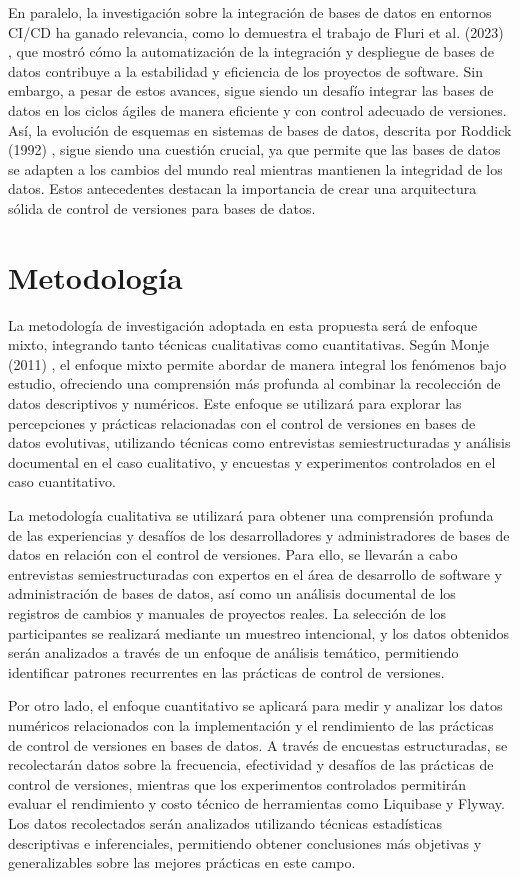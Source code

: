 \documentclass{IEEEtran}
\begin{document}
En paralelo, la investigación sobre la integración de bases de datos en entornos CI/CD ha ganado relevancia, como lo demuestra el trabajo de Fluri et al. (2023) \cite{fluri2023measuring}, que mostró cómo la automatización de la integración y despliegue de bases de datos contribuye a la estabilidad y eficiencia de los proyectos de software. Sin embargo, a pesar de estos avances, sigue siendo un desafío integrar las bases de datos en los ciclos ágiles de manera eficiente y con control adecuado de versiones. Así, la evolución de esquemas en sistemas de bases de datos, descrita por Roddick (1992) \cite{roddick1992schema}, sigue siendo una cuestión crucial, ya que permite que las bases de datos se adapten a los cambios del mundo real mientras mantienen la integridad de los datos. Estos antecedentes destacan la importancia de crear una arquitectura sólida de control de versiones para bases de datos.

\section{Metodología}
La metodología de investigación adoptada en esta propuesta será de enfoque mixto, integrando tanto técnicas cualitativas como cuantitativas. Según Monje (2011) \cite{Monje2011}, el enfoque mixto permite abordar de manera integral los fenómenos bajo estudio, ofreciendo una comprensión más profunda al combinar la recolección de datos descriptivos y numéricos. Este enfoque se utilizará para explorar las percepciones y prácticas relacionadas con el control de versiones en bases de datos evolutivas, utilizando técnicas como entrevistas semiestructuradas y análisis documental en el caso cualitativo, y encuestas y experimentos controlados en el caso cuantitativo.

La metodología cualitativa se utilizará para obtener una comprensión profunda de las experiencias y desafíos de los desarrolladores y administradores de bases de datos en relación con el control de versiones. Para ello, se llevarán a cabo entrevistas semiestructuradas con expertos en el área de desarrollo de software y administración de bases de datos, así como un análisis documental de los registros de cambios y manuales de proyectos reales. La selección de los participantes se realizará mediante un muestreo intencional, y los datos obtenidos serán analizados a través de un enfoque de análisis temático, permitiendo identificar patrones recurrentes en las prácticas de control de versiones.

Por otro lado, el enfoque cuantitativo se aplicará para medir y analizar los datos numéricos relacionados con la implementación y el rendimiento de las prácticas de control de versiones en bases de datos. A través de encuestas estructuradas, se recolectarán datos sobre la frecuencia, efectividad y desafíos de las prácticas de control de versiones, mientras que los experimentos controlados permitirán evaluar el rendimiento y costo técnico de herramientas como Liquibase y Flyway. Los datos recolectados serán analizados utilizando técnicas estadísticas descriptivas e inferenciales, permitiendo obtener conclusiones más objetivas y generalizables sobre las mejores prácticas en este campo.
\end{document}
